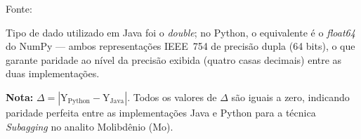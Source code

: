 \begin{table}[H]
\begin{threeparttable}
\begin{center}
\begin{minipage}{0.85\linewidth}
\begin{tablenotes}
\footnotesize
\item Fonte:~\oautor
\item[a] Tipo de dado utilizado em Java foi o \textit{double}; no Python,
o equivalente é o \textit{float64} do NumPy — ambos representações IEEE~754
de precisão dupla (64 bits), o que garante paridade ao nível da precisão exibida (quatro casas decimais) entre as
duas implementações.
\item \textbf{Nota:} $\Delta = |\text{Y}_{\text{Python}} - \text{Y}_{\text{Java}}|$.
Todos os valores de $\Delta$ são iguais a zero, indicando paridade
perfeita entre as implementações Java e Python para a técnica \textit{Subagging}
no analito Molibdênio (Mo).
\end{tablenotes}
\end{minipage}
\end{center}
\end{threeparttable}
\end{table}

